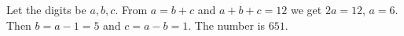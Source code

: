 Let the digits be $a,b,c$. From $a=b+c$ and $a+b+c=12$ we get $2a=12$, $a=6$. Then $b=a-1=5$ and $c=a-b=1$. The number is $\boxed{651}$.
